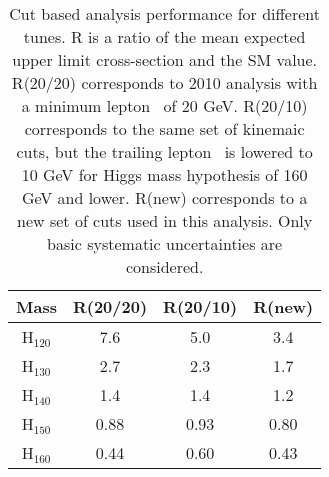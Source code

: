 \begin{table}[!ht]
  \begin{center}
 {\small
  \begin{tabular} {|c|c|c|c|}
  \hline
  Mass   &  R(20/20) & R(20/10) & R(new) \\
  \hline
  H$_{120}$ & 7.6 & 5.0 & 3.4 \\
  H$_{130}$ & 2.7 & 2.3 & 1.7 \\
  H$_{140}$ & 1.4 & 1.4 & 1.2 \\
  H$_{150}$ & 0.88 & 0.93 & 0.80 \\
  H$_{160}$ & 0.44 & 0.60 & 0.43 \\
  \hline
  \end{tabular}
  }
  \caption{Cut based analysis performance for different tunes. R is a ratio of the mean
   expected upper limit cross-section and the SM value.  R(20/20) corresponds 
  to 2010 analysis with a minimum lepton \pt\ of 20 GeV. R(20/10) corresponds to the same 
  set of kinemaic cuts, but the trailing lepton \pt\ is lowered to 10 GeV for Higgs mass hypothesis 
  of 160 GeV and lower. R(new) corresponds to a new set of cuts used in this analysis. Only 
  basic systematic uncertainties are considered.}
   \label{tab:cutanalysis_perf}
  \end{center}
\end{table}

